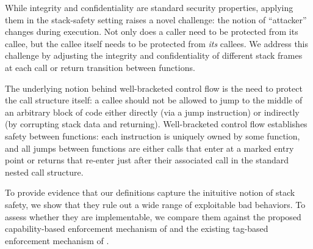 \documentclass[acmsmall,review,anonymous]{acmart}\settopmatter{printfolios=true,printccs=false,printacmref=false}
\begin{document}
While integrity and confidentiality are standard security
properties, applying them in the stack-safety setting raises a novel challenge:
the notion of ``attacker'' changes during execution. Not only
does a caller need to be protected from its callee, but the callee
itself needs to be protected from {\em its} callees.
We address this challenge by adjusting the integrity and confidentiality
of different stack frames at each call or return transition between functions.
 

The underlying notion behind well-bracketed control flow is
the need to protect the call structure itself: a callee should not be
allowed to jump to the middle of an arbitrary block of code either
directly (via a jump instruction) or indirectly (by corrupting stack
data and returning). Well-bracketed control flow establishes safety between
functions: each instruction is uniquely owned by some function, and all jumps between functions
are either calls that enter at a marked entry point or returns that re-enter
just after their associated call in the standard nested call structure.

To provide evidence that our definitions capture the inituitive notion of stack safety,
we show that they rule out a wide  range of exploitable bad behaviors.
To assess whether they are implementable,
we compare them against the proposed capability-based enforcement
mechanism of \citet{Skorstengaard+19}  and the existing tag-based enforcement mechanism
of \citet{DBLP:conf/sp/RoesslerD18}.
\end{document}
